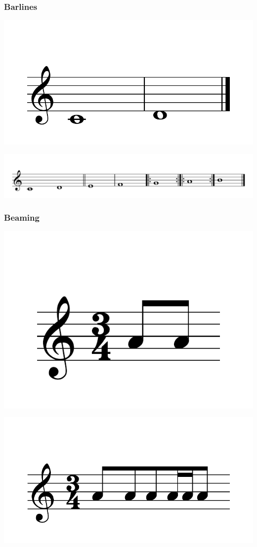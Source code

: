 \documentclass{article}
\begin{document}
\subsubsection{Barlines}
\includegraphics[scale=0.5]{figures_tests/pdf/skern/barlines.pdf}

\includegraphics[scale=0.35]{figures_tests/pdf/skern/barlines2.pdf}


\subsubsection{Beaming}
\includegraphics[scale=0.5]{figures_tests/pdf/skern/beaming0.pdf}

\includegraphics[scale=0.5]{figures_tests/pdf/skern/beaming1.pdf}
\end{document}
